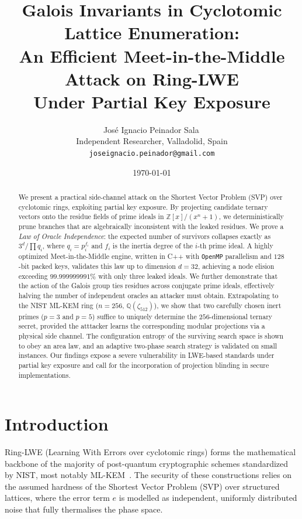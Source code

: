 \documentclass[12pt,a4paper]{article}
\title{\bfseries Galois Invariants in Cyclotomic Lattice Enumeration:\\[4pt]
       \large An Efficient Meet-in-the-Middle Attack on Ring-LWE\\[2pt]
       \large Under Partial Key Exposure}
\author{%
    José Ignacio Peinador Sala\,\orcidlink{0000-0002-1825-0097}\\[4pt]
    \small Independent Researcher, Valladolid, Spain\\
    \small \texttt{joseignacio.peinador@gmail.com}
}
\date{\today}
\begin{document}
\maketitle

\begin{abstract}
We present a practical side-channel attack on the Shortest Vector Problem (SVP) over cyclotomic rings, exploiting partial key exposure. By projecting candidate ternary vectors onto the residue fields of prime ideals in $\mathbb{Z}[x]/(x^n+1)$, we deterministically prune branches that are algebraically inconsistent with the leaked residues. We prove a \emph{Law of Oracle Independence}: the expected number of survivors collapses exactly as $3^d / \prod q_i$, where $q_i = p_i^{f_i}$ and $f_i$ is the inertia degree of the $i$-th prime ideal. A highly optimized Meet-in-the-Middle engine, written in C++ with \texttt{OpenMP} parallelism and $128$-bit packed keys, validates this law up to dimension $d=32$, achieving a node elision exceeding $99.999999991\%$ with only three leaked ideals. We further demonstrate that the action of the Galois group ties residues across conjugate prime ideals, effectively halving the number of independent oracles an attacker must obtain. Extrapolating to the NIST ML-KEM ring ($n=256$, $\mathbb{Q}(\zeta_{512})$), we show that two carefully chosen inert primes ($p=3$ and $p=5$) suffice to uniquely determine the $256$-dimensional ternary secret, provided the atttacker learns the corresponding modular projections via a physical side channel. The configuration entropy of the surviving search space is shown to obey an area law, and an adaptive two-phase search strategy is validated on small instances. Our findings expose a severe vulnerability in LWE-based standards under partial key exposure and call for the incorporation of projection blinding in secure implementations.
\end{abstract}

\section{Introduction}
\label{sec:intro}

Ring-LWE (Learning With Errors over cyclotomic rings) forms the mathematical backbone of the majority of post-quantum cryptographic schemes standardized by NIST, most notably ML-KEM~\cite{NIST2024}. The security of these constructions relies on the assumed hardness of the Shortest Vector Problem (SVP) over structured lattices, where the error term $e$ is modelled as independent, uniformly distributed noise that fully thermalises the phase space.
\end{document}
